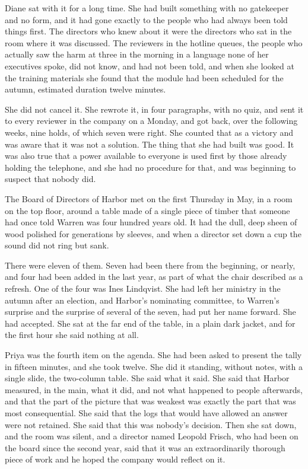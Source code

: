 Diane sat with it for a long time. She had built something with no gatekeeper and no form, and it had gone exactly to the people who had always been told things first. The directors who knew about it were the directors who sat in the room where it was discussed. The reviewers in the hotline queues, the people who actually saw the harm at three in the morning in a language none of her executives spoke, did not know, and had not been told, and when she looked at the training materials she found that the module had been scheduled for the autumn, estimated duration twelve minutes.

She did not cancel it. She rewrote it, in four paragraphs, with no quiz, and sent it to every reviewer in the company on a Monday, and got back, over the following weeks, nine holds, of which seven were right. She counted that as a victory and was aware that it was not a solution. The thing that she had built was good. It was also true that a power available to everyone is used first by those already holding the telephone, and she had no procedure for that, and was beginning to suspect that nobody did.

\scenebreak
\noindent The Board of Directors of Harbor met on the first Thursday in May, in a room on the top floor, around a table made of a single piece of timber that someone had once told Warren was four hundred years old. It had the dull, deep sheen of wood polished for generations by sleeves, and when a director set down a cup the sound did not ring but sank.

There were eleven of them. Seven had been there from the beginning, or nearly, and four had been added in the last year, as part of what the chair described as a refresh. One of the four was Ines Lindqvist. She had left her ministry in the autumn after an election, and Harbor's nominating committee, to Warren's surprise and the surprise of several of the seven, had put her name forward. She had accepted. She sat at the far end of the table, in a plain dark jacket, and for the first hour she said nothing at all.

Priya was the fourth item on the agenda. She had been asked to present the tally in fifteen minutes, and she took twelve. She did it standing, without notes, with a single slide, the two-column table. She said what it said. She said that Harbor measured, in the main, what it did, and not what happened to people afterwards, and that the part of the picture that was weakest was exactly the part that was most consequential. She said that the logs that would have allowed an answer were not retained. She said that this was nobody's decision. Then she sat down, and the room was silent, and a director named Leopold Frisch, who had been on the board since the second year, said that it was an extraordinarily thorough piece of work and he hoped the company would reflect on it.

